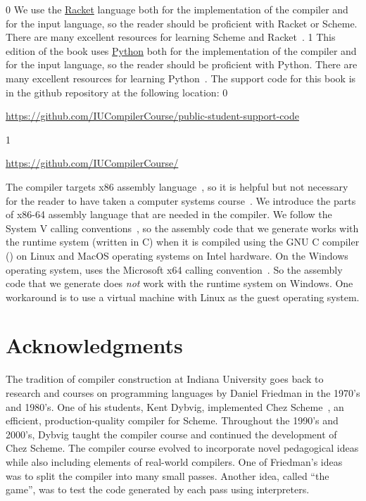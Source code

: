 \documentclass[7x10,nocrop]{TimesAPriori_MIT}%
\def\racketEd{0}
\def\pythonEd{1}
\def\edition{0}
\newcommand{\racket}[1]{{\if\edition\racketEd{#1}\fi}}
\newcommand{\python}[1]{{\if\edition\pythonEd #1\fi}}
\begin{document}
\racket{
We use the \href{https://racket-lang.org/}{Racket} language both for
the implementation of the compiler and for the input language, so the
reader should be proficient with Racket or Scheme. There are many
excellent resources for learning Scheme and
Racket~\citep{Dybvig:1987aa,Abelson:1996uq,Friedman:1996aa,Felleisen:2001aa,Felleisen:2013aa,Flatt:2014aa}.
}
\python{
  This edition of the book uses \href{https://www.python.org/}{Python}
  both for the implementation of the compiler and for the input language, so the
reader should be proficient with Python. There are many
excellent resources for learning Python~\citep{Lutz:2013vp,Barry:2016vj,Sweigart:2019vn,Matthes:2019vs}.
}
The support code for this book is in the github repository at
the following location:
\if\edition\racketEd
\begin{center}\small
  \url{https://github.com/IUCompilerCourse/public-student-support-code}
\end{center}
\fi
\if\edition\pythonEd
\begin{center}\small
  \url{https://github.com/IUCompilerCourse/}
\end{center}
\fi

The compiler targets x86 assembly language~\citep{Intel:2015aa}, so it
is helpful but not necessary for the reader to have taken a computer
systems course~\citep{Bryant:2010aa}. We introduce the parts of x86-64
assembly language that are needed in the compiler.
%
We follow the System V calling
conventions~\citep{Bryant:2005aa,Matz:2013aa}, so the assembly code
that we generate works with the runtime system (written in C) when it
is compiled using the GNU C compiler () on Linux and MacOS
operating systems on Intel hardware.
%
On the Windows operating system,  uses the Microsoft x64
calling convention~\citep{Microsoft:2018aa,Microsoft:2020aa}. So the
assembly code that we generate does \emph{not} work with the runtime
system on Windows. One workaround is to use a virtual machine with
Linux as the guest operating system.

\section*{Acknowledgments}

The tradition of compiler construction at Indiana University goes back
to research and courses on programming languages by Daniel Friedman in
the 1970's and 1980's.  One of his students, Kent Dybvig, implemented
Chez Scheme~\citep{Dybvig:2006aa}, an efficient, production-quality
compiler for Scheme.  Throughout the 1990's and 2000's, Dybvig taught
the compiler course and continued the development of Chez Scheme.
%
The compiler course evolved to incorporate novel pedagogical ideas
while also including elements of real-world compilers.  One of
Friedman's ideas was to split the compiler into many small
passes. Another idea, called ``the game'', was to test the code
generated by each pass using interpreters.
\end{document}
